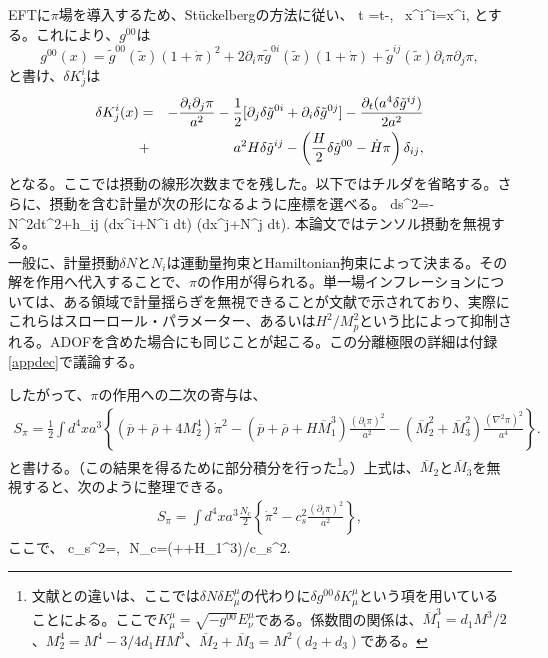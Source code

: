 EFTに$\pi$場を導入するため、St\"uckelbergの方法に従い、
\beq
t \to {}=t-\pi,~ x^i\to {}^i=x^i,\label{pionstx}\eeq
とする。これにより、$g^{00}$は
\begin{equation}
\label{pionstx2}
g^{00}(x)=\tilde{g}^{00}(\tilde{x}) (1+\dot{\pi})^2+2 \partial_i\pi \tilde{g}^{0i}(\tilde{x})(1+\dot{\pi})+\tilde{g}^{ij}(\tilde{x}) \partial_i\pi\partial_j\pi,
\end{equation} と書け、$\delta K^{i}_{j}$は
\begin{eqnarray}
\delta K^{i}_{j}(x)&=&-\frac{\partial_i\partial_j\pi}{a^2}-\frac{1}{2}[\partial_j \delta\tilde{g}^{0i}+\partial_i \delta\tilde{g}^{0j}]-\frac{\partial_t(a^4\delta\tilde{g}^{ij})}{2 a^2}\nonumber \\ &+& a^2 H\delta\tilde{g}^{ij}-\left(\frac{H}{2}\delta\tilde{g}^{00}-\dot{H}\pi\right)\delta_{ij},
\end{eqnarray}
となる。ここでは摂動の線形次数までを残した。以下ではチルダを省略する。さらに、摂動を含む計量が次の形になるように座標を選べる。
\be ds^2=-N^2dt^2+h_{ij} (dx^i+N^i dt) (dx^j+N^j dt).\ee
本論文ではテンソル摂動を無視する。\\

一般に、計量摂動$\delta N$と$N_i$は運動量拘束とHamiltonian拘束によって決まる。その解を作用へ代入することで、$\pi$の作用が得られる。単一場インフレーションについては、ある領域で計量揺らぎを無視できることが文献\cite{eft1}で示されており、実際にこれらはスローロール・パラメーター、あるいは$H^2/M_p^2$という比によって抑制される。ADOFを含めた場合にも同じことが起こる。この分離極限の詳細は付録\ref{appdec}で議論する。

したがって、$\pi$の作用への二次の寄与は、
\begin{eqnarray}\label{cuad}
S_{\pi}=\frac{1}{2}\int d^4x a^3\left\{(\overline{p}+\overline{\rho}+4M_2^4)\dot{\pi}^2-(\overline{p}+\overline{\rho}+H\overline{M}_1^3)\frac{(\partial_i\pi)^2}{a^2}-(\overline{M}^2_2+\overline{M}^2_3)\frac{(\nabla^2\pi)^2}{a^4}\right\}.
\end{eqnarray}
と書ける。（この結果を得るために部分積分を行った\footnote{文献\cite{eft1}との違いは、ここでは$\delta N\delta E^{\mu}_{\mu}$の代わりに$\delta g^{00}\delta K^{\mu}_{\mu}$という項を用いていることによる。ここで$K^{\mu}_{\mu}=\sqrt{-g^{00}}E^{\mu}_{\nu}$である。係数間の関係は、$\overline{M}_1^3=d_1 M^3/2$、$M^4_2=M^4-3/4 d_1 H M^3$、$\overline{M}_2+\overline{M}_3=M^2(d_2+d_3)$である。}。）上式は、$\overline{M}_2$と$\overline{M}_3$を無視すると、次のように整理できる。
\begin{eqnarray}\label{l2pi}
S_{\pi}=\int d^4x a^3\frac{N_c}{2}\left\{\dot{\pi}^2-c_s^2\frac{(\partial_i\pi)^2}{a^2}\right\},
\end{eqnarray}ここで、\beq \label{ncs} c_s^2=,\,\, N_c=(+\overline{\rho}+H_1^3)/c_s^2.\eeq

